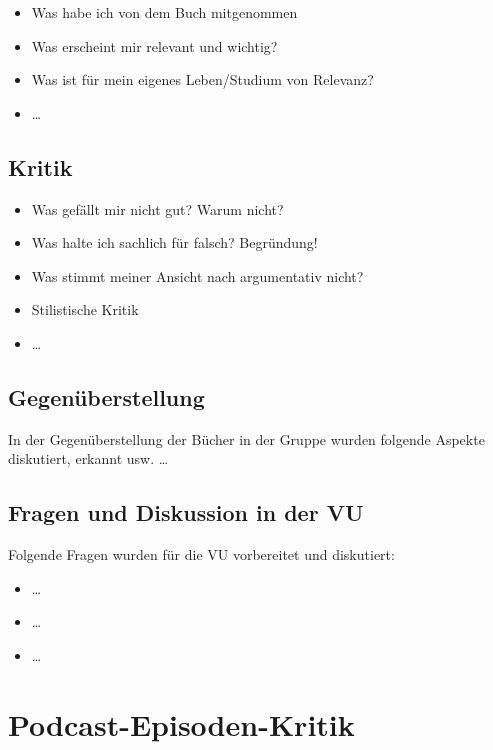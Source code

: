 \documentclass[twoside, a4paper, DIV=11, open=any, bibliography=totoc]{scrbook}
\begin{document}
\begin{itemize}
    \item Was habe ich von dem Buch mitgenommen
    \item Was erscheint mir relevant und wichtig?
    \item Was ist für mein eigenes Leben/Studium von Relevanz?
    \item \ldots
\end{itemize}

\section{Kritik} \label{sec:litkritik}

\begin{itemize}
    \item Was gefällt mir nicht gut? Warum nicht?
    \item Was halte ich sachlich für falsch? Begründung!
    \item Was stimmt meiner Ansicht nach argumentativ nicht?
    \item Stilistische Kritik
    \item \ldots
\end{itemize}

\section{Gegenüberstellung} \label{sec:litgegenueber}

In der Gegenüberstellung der Bücher in der Gruppe wurden folgende Aspekte diskutiert, erkannt usw. \ldots

\section{Fragen und Diskussion in der VU} \label{sec:fragenvu}

Folgende Fragen wurden für die VU vorbereitet und diskutiert:

\begin{itemize}
    \item \ldots
    \item \ldots
    \item \ldots
\end{itemize}


\chapter{Podcast-Episoden-Kritik} \label{chap:podkrit}
\end{document}
